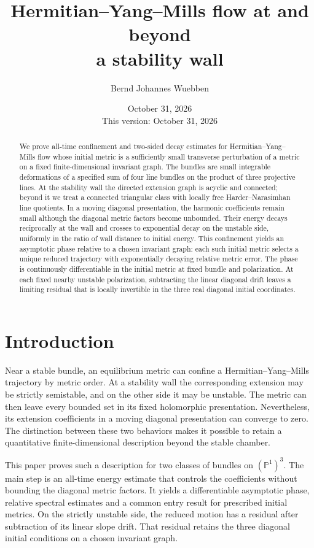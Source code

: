 \documentclass[11pt]{amsart}
\title[HYM flow at and beyond a stability wall]{Hermitian--Yang--Mills flow at and beyond\\ a stability wall}
\author{Bernd Johannes Wuebben}
\date{October 31, 2026\\This version: October 31, 2026}
\theoremstyle{definition}
\theoremstyle{remark}
\newcommand{\PP}{\mathbb P}
\begin{document}
\begin{abstract}
We prove all-time confinement and two-sided decay estimates for
Hermitian--Yang--Mills flow whose initial metric is a sufficiently small
transverse perturbation of a metric on a fixed finite-dimensional
invariant graph. The bundles are
small integrable deformations of a specified sum of four line bundles
on the product of three projective lines. At the stability wall the directed extension graph is acyclic
and connected; beyond it we treat a connected triangular class with locally
free Harder--Narasimhan line quotients. In a moving diagonal
presentation, the harmonic coefficients remain small although the
diagonal metric factors become unbounded. Their energy decays
reciprocally at the wall and crosses to exponential decay on the
unstable side, uniformly in the ratio of wall distance to initial
energy. This confinement yields an asymptotic phase relative to a
chosen invariant graph: each such initial metric selects a unique
reduced trajectory with exponentially decaying relative metric error.
The phase is continuously differentiable in the initial metric at
fixed bundle and polarization. At each fixed nearby unstable
polarization, subtracting the linear diagonal drift leaves a limiting
residual that is locally invertible in the three real diagonal initial
coordinates.
\end{abstract}

\maketitle


\section{Introduction}\label{sec:introduction}

Near a stable bundle, an equilibrium metric can confine a
Hermitian--Yang--Mills trajectory by metric order. At a stability
wall the corresponding extension may be strictly semistable,
and on the other side it may be unstable. The metric can then
leave every bounded set in its fixed holomorphic presentation.
Nevertheless, its extension coefficients in a moving diagonal
presentation can converge to zero. The distinction between
these two behaviors makes it possible to retain a quantitative
finite-dimensional description beyond the stable chamber.

This paper proves such a description for two classes of bundles
on $(\PP^1)^3$. The main step is an all-time energy estimate
that controls the coefficients without bounding the diagonal
metric factors. It yields a differentiable asymptotic phase,
relative spectral estimates and a common entry result for
prescribed initial metrics. On the strictly unstable side,
the reduced motion has a residual after subtraction of its
linear slope drift. That residual retains the three diagonal
initial conditions on a chosen invariant graph.
\end{document}
